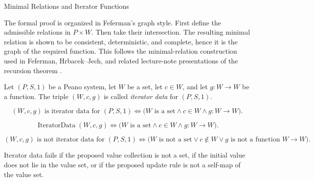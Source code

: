 \begin{topicbox}{Minimal Relations and Iterator Functions}
\begin{exposition}
The formal proof is organized in Feferman's graph style. First define the
admissible relations in $P\times W$. Then take their intersection. The
resulting minimal relation is shown to be consistent, deterministic, and
complete, hence it is the graph of the required function. This follows the
minimal-relation construction used in Feferman, Hrbacek--Jech, and related
lecture-note presentations of the recursion theorem
\citep{FefermanNumberSystems1964,hrbacek_jech1999,chi_recursion_wustl}.
\end{exposition}

\begin{tcolorbox}[colback=defbox, colframe=defborder, arc=2pt,
  left=6pt, right=6pt, top=4pt, bottom=4pt,
  title={\small\textbf{Definition (Iterator Data)}},
  fonttitle=\small\bfseries]
\begin{definition}
\label{def:iterator-data-on-peano-system}
Let $(P,S,1)$ be a Peano system, let $W$ be a set, let $c\in W$, and let
$g:W\to W$ be a function. The triple $(W,c,g)$ is called \emph{iterator data}
for $(P,S,1)$.
\end{definition}
\end{tcolorbox}

\begin{remark*}
\[
(W,c,g) \text{ is iterator data for } (P,S,1)
\Longleftrightarrow
\bigl(W \text{ is a set}\land c\in W\land g:W\to W\bigr).
\]
\end{remark*}

\begin{remark*}
\[
\operatorname{IteratorData}(W,c,g)
\Longleftrightarrow
\bigl(W \text{ is a set}\land c\in W\land g:W\to W\bigr).
\]
\end{remark*}

\begin{remark*}
\[
(W,c,g) \text{ is not iterator data for } (P,S,1)
\Longleftrightarrow
\bigl(W \text{ is not a set}\lor c\notin W\lor g \text{ is not a function } W\to W\bigr).
\]
\end{remark*}

\begin{remark*}
Iterator data fails if the proposed value collection is not a set, if the
initial value does not lie in the value set, or if the proposed update rule is
not a self-map of the value set.
\end{remark*}


\end{topicbox}
